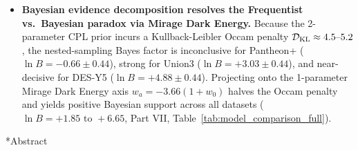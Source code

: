 \documentclass[11pt,letterpaper]{article}
\makeatletter
\renewcommand{\section}{\@startsection{section}{1}{\z@}%
  {-16pt \@plus -4pt \@minus -2pt}%
  {8pt \@plus 2pt}%
  {\normalfont\Large\bfseries\color{primary}}}
\let\orig@section\section
\renewcommand{\section}{\@ifstar{\star@section}{\nostar@section}}
\newcommand{\nostar@section}[1]{%
  \orig@section{#1}%
  \vspace{-6pt}\noindent{\color{tealaccent}\rule{\textwidth}{1.5pt}}\vspace{4pt}\par\nobreak%
}
\newcommand{\star@section}[1]{%
  \orig@section*{#1}%
  \vspace{-6pt}\noindent{\color{tealaccent}\rule{\textwidth}{1.5pt}}\vspace{4pt}\par\nobreak%
}
\makeatother
\begin{document}
\begin{itemize}
    \item[\textcolor{tealaccent}{\textbullet}] \textbf{Bayesian evidence decomposition resolves the Frequentist vs.\ Bayesian paradox via Mirage Dark Energy.} Because the 2-parameter CPL prior incurs a Kullback-Leibler Occam penalty $\mathcal{D}_{\rm KL} \approx 4.5\text{--}5.2$, the nested-sampling Bayes factor is inconclusive for Pantheon+ ($\ln B = -0.66 \pm 0.44$), strong for Union3 ($\ln B = +3.03 \pm 0.44$), and near-decisive for DES-Y5 ($\ln B = +4.88 \pm 0.44$). Projecting onto the 1-parameter Mirage Dark Energy axis $w_a = -3.66(1+w_0)$ halves the Occam penalty and yields positive Bayesian support across all datasets ($\ln B = +1.85\text{ to }+6.65$, Part VII, Table~\ref{tab:model_comparison_full}).
\end{itemize}
\clearpage

\listoffigures
\vspace{14pt}
\listoftables
\clearpage

\section*{Abstract}
\end{document}
